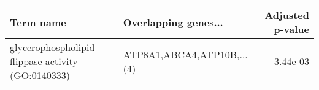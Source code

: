 \begin{tabular}{llr}
\toprule
                                         Term name &       Overlapping genes... &  Adjusted p-value \\
\midrule
glycerophospholipid flippase activity (GO:0140333) & ATP8A1,ABCA4,ATP10B,...(4) &          3.44e-03 \\
\bottomrule
\end{tabular}
